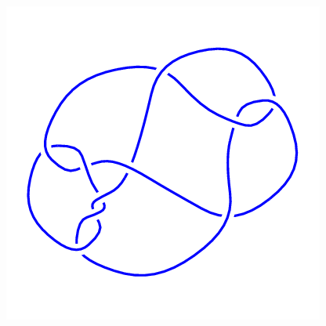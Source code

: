 \begin{figure}[H]
\begin{minipage}[b]{.18\linewidth}
    \end{minipage}
    \begin{minipage}[b]{.18\linewidth}
        \centering
        \includegraphics[width=\linewidth]{../data/10_56.png}
    \end{minipage}
\end{figure}
